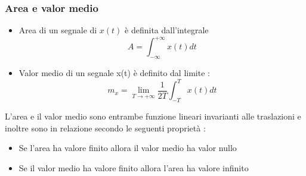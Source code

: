 \documentclass{article}
\theoremstyle{definition}
\newcommand{\intinf}{\int_{-\infty}^{+\infty}}
\begin{document}
\subsubsection{Area e valor medio}
\begin{itemize}
\item Area di un segnale di $x(t)$ è definita dall'integrale 
$$A= \intinf x(t)dt$$
\item Valor medio di un segnale x(t) è definito dal limite : 
$$m_x=\lim_{T \rightarrow +\infty}\frac{1}{2T} \int_{-T}^{T}x(t)dt$$
\end{itemize}
L'area e il valor medio sono entrambe funzione lineari invarianti alle traslazioni e inoltre sono in relazione secondo le seguenti proprietà : 
\begin{itemize}
 \item Se l'area ha valore finito allora il valor medio ha valor nullo 
 \item Se il valor medio ha valore finito allora l'area ha valore infinito 
\end{itemize}
\end{document}
